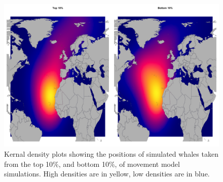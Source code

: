 \documentclass[a4paper,12pt]{article}
\begin{document}
    \begin{figure}[!htbp]
    \centering
      \includegraphics[width=\linewidth]{figures/Figure-S7-kernals.png}
      \caption{Kernal density plots showing the positions of simulated whales taken from the top 10\%, and bottom 10\%, of movement model simulations. 
      High densities are in yellow, low densities are in blue.} %
      \label{figs8}
  \end{figure}
 
\newpage


\end{document}
